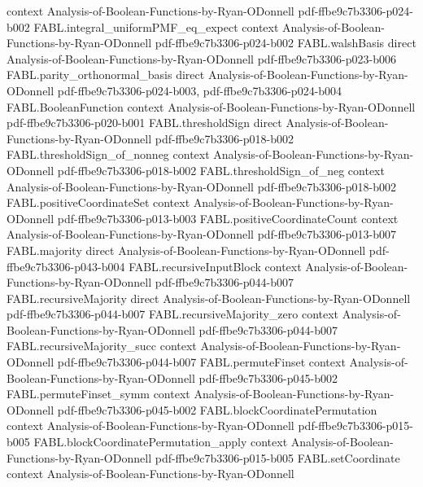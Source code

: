 \begin{theorem}
  {context}
  {Analysis-of-Boolean-Functions-by-Ryan-ODonnell}
  {pdf-ffbe9c7b3306-p024-b002}
\proofstep
  {FABL.integral_uniformPMF_eq_expect}
  {context}
  {Analysis-of-Boolean-Functions-by-Ryan-ODonnell}
  {pdf-ffbe9c7b3306-p024-b002}
\proofstep
  {FABL.walshBasis}
  {direct}
  {Analysis-of-Boolean-Functions-by-Ryan-ODonnell}
  {pdf-ffbe9c7b3306-p023-b006}
\proofstep
  {FABL.parity_orthonormal_basis}
  {direct}
  {Analysis-of-Boolean-Functions-by-Ryan-ODonnell}
  {pdf-ffbe9c7b3306-p024-b003,
    pdf-ffbe9c7b3306-p024-b004}
\proofstep
  {FABL.BooleanFunction}
  {context}
  {Analysis-of-Boolean-Functions-by-Ryan-ODonnell}
  {pdf-ffbe9c7b3306-p020-b001}
\proofstep
  {FABL.thresholdSign}
  {direct}
  {Analysis-of-Boolean-Functions-by-Ryan-ODonnell}
  {pdf-ffbe9c7b3306-p018-b002}
\proofstep
  {FABL.thresholdSign_of_nonneg}
  {context}
  {Analysis-of-Boolean-Functions-by-Ryan-ODonnell}
  {pdf-ffbe9c7b3306-p018-b002}
\proofstep
  {FABL.thresholdSign_of_neg}
  {context}
  {Analysis-of-Boolean-Functions-by-Ryan-ODonnell}
  {pdf-ffbe9c7b3306-p018-b002}
\proofstep
  {FABL.positiveCoordinateSet}
  {context}
  {Analysis-of-Boolean-Functions-by-Ryan-ODonnell}
  {pdf-ffbe9c7b3306-p013-b003}
\proofstep
  {FABL.positiveCoordinateCount}
  {context}
  {Analysis-of-Boolean-Functions-by-Ryan-ODonnell}
  {pdf-ffbe9c7b3306-p013-b007}
\proofstep
  {FABL.majority}
  {direct}
  {Analysis-of-Boolean-Functions-by-Ryan-ODonnell}
  {pdf-ffbe9c7b3306-p043-b004}
\proofstep
  {FABL.recursiveInputBlock}
  {context}
  {Analysis-of-Boolean-Functions-by-Ryan-ODonnell}
  {pdf-ffbe9c7b3306-p044-b007}
\proofstep
  {FABL.recursiveMajority}
  {direct}
  {Analysis-of-Boolean-Functions-by-Ryan-ODonnell}
  {pdf-ffbe9c7b3306-p044-b007}
\proofstep
  {FABL.recursiveMajority_zero}
  {context}
  {Analysis-of-Boolean-Functions-by-Ryan-ODonnell}
  {pdf-ffbe9c7b3306-p044-b007}
\proofstep
  {FABL.recursiveMajority_succ}
  {context}
  {Analysis-of-Boolean-Functions-by-Ryan-ODonnell}
  {pdf-ffbe9c7b3306-p044-b007}
\proofstep
  {FABL.permuteFinset}
  {context}
  {Analysis-of-Boolean-Functions-by-Ryan-ODonnell}
  {pdf-ffbe9c7b3306-p045-b002}
\proofstep
  {FABL.permuteFinset_symm}
  {context}
  {Analysis-of-Boolean-Functions-by-Ryan-ODonnell}
  {pdf-ffbe9c7b3306-p045-b002}
\proofstep
  {FABL.blockCoordinatePermutation}
  {context}
  {Analysis-of-Boolean-Functions-by-Ryan-ODonnell}
  {pdf-ffbe9c7b3306-p015-b005}
\proofstep
  {FABL.blockCoordinatePermutation_apply}
  {context}
  {Analysis-of-Boolean-Functions-by-Ryan-ODonnell}
  {pdf-ffbe9c7b3306-p015-b005}
\proofstep
  {FABL.setCoordinate}
  {context}
  {Analysis-of-Boolean-Functions-by-Ryan-ODonnell}

\end{theorem}

